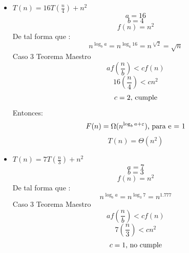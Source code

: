 \documentclass[10pt,a4paper]{article}
\begin{document}
\begin{itemize}
		\item $T(n) = 16T(\frac{n}{4})+n^{2}$
			\begin{equation*}
				a = 16
			\end{equation*}
			\begin{equation*}
				b = 4
			\end{equation*}
			\begin{equation*}
				f(n) = n^{2}
			\end{equation*}
			De tal forma que :
			\begin{equation*}
				n^{\log_{b}{a}} = n^{\log_{4}{16}} = n^{\sqrt[1]{2}} = \sqrt{n}
			\end{equation*}
			Caso 3 Teorema Maestro
			\begin{equation*}
				af(\frac{n}{b}) < c f(n)
			\end{equation*}
			\begin{equation*}
				16(\frac{n}{4}) < cn^{2}
			\end{equation*}
			\begin{equation*}
				c = 2 \textup {, cumple}
			\end{equation*}
			Entonces:
			\begin{equation*}
				F(n) = \Omega (n^{\log_{b}{a}+\varepsilon})  \textup{, para e = 1}
			\end{equation*}
			\begin{equation*}
				T(n) = \Theta(n^{2})
			\end{equation*}
		\item $T(n) = 7T(\frac{n}{3})+n^{2}$
			\begin{equation*}
				a = 7
			\end{equation*}
			\begin{equation*}
				b = 3
			\end{equation*}
			\begin{equation*}
				f(n) = n^{2}
			\end{equation*}
			De tal forma que :
			\begin{equation*}
				n^{\log_{b}{a}} = n^{\log_{3}{7}} = n^{1.777}
			\end{equation*}
			Caso 3 Teorema Maestro
			\begin{equation*}
				af(\frac{n}{b}) < c f(n)
			\end{equation*}
			\begin{equation*}
				7(\frac{n}{3}) < cn^{2}
			\end{equation*}
			\begin{equation*}
				c = 1 \textup {, no cumple}
			\end{equation*}

\end{itemize}
\end{document}
